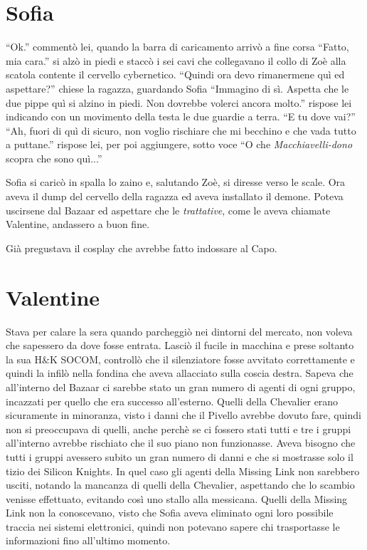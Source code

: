   \section*{Sofia}

    ``Ok.'' commentò lei, quando la barra di caricamento arrivò a fine corsa ``Fatto, mia cara.'' si alzò in piedi e
    staccò i sei cavi che collegavano il collo di Zoè alla scatola contente il cervello cybernetico. ``Quindi ora devo
    rimanermene quì ed aspettare?'' chiese la ragazza, guardando Sofia ``Immagino di sì. Aspetta che le due pippe quì si alzino in
    piedi. Non dovrebbe volerci ancora molto.'' rispose lei indicando con un movimento della testa le due guardie a
    terra. ``E tu dove vai?'' ``Ah, fuori di quì di sicuro, non voglio rischiare che mi becchino e che vada tutto a
    puttane.'' rispose lei, per poi aggiungere, sotto voce ``O che \emph{Macchiavelli-dono} scopra che sono quì...''

    Sofia si caricò in spalla lo zaino e, salutando Zoè, si diresse verso le scale. Ora aveva il dump del cervello della
    ragazza ed aveva installato il demone. Poteva uscirsene dal Bazaar ed aspettare che le \emph{trattative}, come le
    aveva chiamate Valentine, andassero a buon fine.

    Già pregustava il cosplay che avrebbe fatto indossare al Capo.

  \section*{Valentine}

    Stava per calare la sera quando parcheggiò nei dintorni del mercato, non voleva che sapessero da dove fosse entrata.
    Lasciò il fucile in macchina e prese soltanto la sua H\&K SOCOM, controllò che il silenziatore fosse avvitato
    correttamente e quindi la infilò nella fondina che aveva allacciato sulla coscia destra. Sapeva che all'interno del
    Bazaar ci sarebbe stato un gran numero di agenti di ogni gruppo, incazzati per quello che era successo all'esterno.
    Quelli della Chevalier erano sicuramente in minoranza, visto i danni che il Pivello avrebbe dovuto fare, quindi non
    si preoccupava di quelli, anche perchè se ci fossero stati tutti e tre i gruppi all'interno avrebbe rischiato che il
    suo piano non funzionasse. Aveva bisogno che tutti i gruppi avessero subito un gran numero di danni e che si
    mostrasse solo il tizio dei Silicon Knights. In quel caso gli agenti della Missing Link non sarebbero usciti,
    notando la mancanza di quelli della Chevalier, aspettando che lo scambio venisse effettuato, evitando così uno
    stallo alla messicana. Quelli della Missing
    Link non la conoscevano, visto che Sofia aveva eliminato ogni loro possibile traccia nei sistemi elettronici, quindi
    non potevano sapere chi trasportasse le informazioni fino all'ultimo momento.

